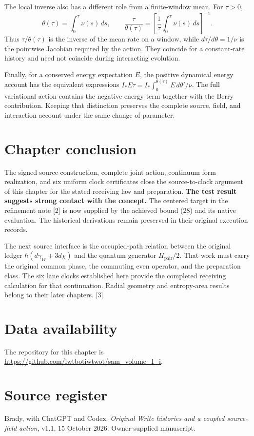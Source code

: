 \documentclass[10pt,twocolumn,letterpaper]{article}
\begin{document}
The local inverse also has a different role from a finite-window mean. For $\tau>0$,
\[
\theta(\tau)=\int_0^\tau\nu(s)\,ds,
\qquad
\frac{\tau}{\theta(\tau)}
=\left[\frac1\tau\int_0^\tau\nu(s)\,ds\right]^{-1}.
\]
Thus $\tau/\theta(\tau)$ is the inverse of the mean rate on a window, while $d\tau/d\theta=1/\nu$ is the pointwise Jacobian required by the action. They coincide for a constant-rate history and need not coincide during interacting evolution.

Finally, for a conserved energy expectation $E$, the positive dynamical energy account has the equivalent expressions $I_*E\tau=I_*\int_0^{\theta(\tau)}E\,d\theta'/\nu$. The full variational action contains the negative energy term together with the Berry contribution. Keeping that distinction preserves the complete source, field, and interaction account under the same change of parameter.


\section{Chapter conclusion}
The signed source construction, complete joint action, continuum form realization, and six uniform clock certificates close the source-to-clock argument of this chapter for the stated receiving law and preparation. \textbf{The test result suggests strong contact with the concept.} The centered target in the refinement note [2] is now supplied by the achieved bound (28) and its native evaluation. The historical derivations remain preserved in their original execution records.

The next source interface is the occupied-path relation between the original ledger $\hbar(d\gamma_W+3d\chi)$ and the quantum generator $H_{\mathrm{pair}}/2$. That work must carry the original common phase, the commuting even operator, and the preparation class. The six lane clocks established here provide the completed receiving calculation for that continuation. Radial geometry and entropy-area results belong to their later chapters. [3]


\section*{Data availability}
The repository for this chapter is \url{https://github.com/iwtbotiwtwot/sam_volume_I_i}.

\section*{Source register}
\begingroup\footnotesize
\noindent[1] Brady, with ChatGPT and Codex. \emph{Original Write histories and a coupled source-field action}, v1.1, 15 October 2026. Owner-supplied manuscript.
\end{document}
